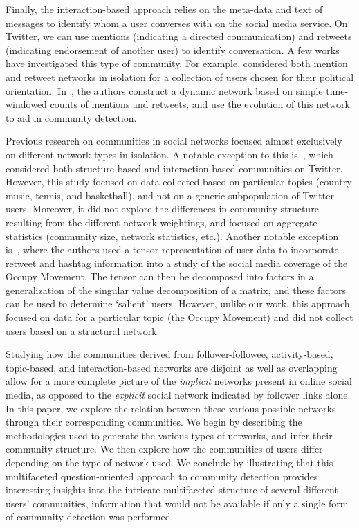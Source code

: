 Finally, the interaction-based approach relies on the meta-data and text of messages to identify whom a user converses with on the social media service. On Twitter, we can use mentions (indicating a directed communication) and retweets (indicating endorsement of another user) to identify conversation. 
A few works have investigated this type of community. For example, \cite{conover2011political} considered both mention and retweet networks in isolation for a collection of users chosen for their political orientation. In~\cite{deitrick2013mutually}, the authors construct a dynamic network based on simple time-windowed counts of mentions and retweets, and use the evolution of this network to aid in community detection.

Previous research on communities in social networks focused almost exclusively on different network types in isolation.
A notable exception to this is~\cite{lim2012tweets}, which considered both structure-based and interaction-based communities on Twitter. However, this study focused on data collected based on particular topics (country music, tennis, and basketball), and not on a generic subpopulation of Twitter users. Moreover, it did not explore the differences in community structure resulting from the different network weightings, and focused on aggregate statistics (community size, network statistics, etc.). Another notable exception is~\cite{kao2013talison}, where the authors used a tensor representation of user data to incorporate retweet and hashtag information into a study of the social media coverage of the Occupy Movement. The tensor can then be decomposed into factors in a generalization of the singular value decomposition of a matrix, and these factors can be used to determine `salient' users. However, unlike our work, this approach focused on data for a particular topic (the Occupy Movement) and did not collect users based on a structural network.

Studying how the communities derived from follower-followee, activity-based, topic-based, and interaction-based networks are disjoint as well as overlapping allow for a more complete picture of the \emph{implicit} networks present in online social media, as opposed to the \emph{explicit} social network indicated by follower links alone. In this paper, we explore the relation between these various possible networks through their corresponding communities. We begin by describing the methodologies used to generate the various types of networks, and infer their community structure.  We then explore how the communities of users differ depending on the type of network used.
We conclude by illustrating that this multifaceted question-oriented approach to community detection provides interesting insights into the intricate multifaceted structure of several different users' communities, information that would not be available if only a single form of community detection was performed. 

